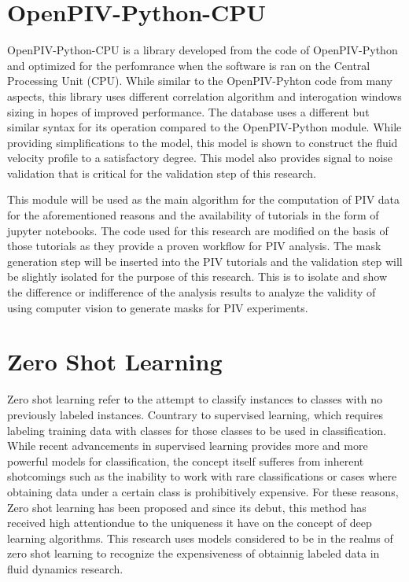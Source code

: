 \documentclass[12pt]{report}
\begin{document}
\section{OpenPIV-Python-CPU}
OpenPIV-Python-CPU is a library developed from the code of OpenPIV-Python and optimized for the perfomrance when the
software is ran on the Central Processing Unit (CPU). While similar to the OpenPIV-Pyhton code from many aspects, this
library uses different correlation algorithm and interogation windows sizing in hopes of improved performance. The database uses
a different but similar syntax for its operation compared to the OpenPIV-Python module. While providing simplifications to the model, this model
is shown to construct the fluid velocity profile to a satisfactory degree. This model also provides signal to noise validation that is critical for
the validation step of this research.

This module will be used as the main algorithm for the computation of PIV data for the aforementioned reasons and the availability of tutorials in the form
of jupyter notebooks. The code used for this research are modified on the basis of those tutorials as they provide a proven workflow for PIV analysis.
The mask generation step will be inserted into the PIV tutorials and the validation step will be slightly isolated for the 
purpose of this research. This is to isolate and show the difference or indifference of the analysis results to analyze the validity of using computer vision to generate
masks for PIV experiments.
\section{Zero Shot Learning}
Zero shot learning refer to the attempt to classify instances to classes with no previously labeled instances. Countrary
to supervised learning, which requires labeling training data with classes for those classes to be used in classification.
While recent advancements in supervised learning provides more and more powerful models for classification, the concept 
itself sufferes from inherent shotcomings such as the inability to work with rare classifications or cases where obtaining data 
under a certain class is prohibitively expensive. For these reasons, Zero shot learning has been proposed and since its debut, this method has
received high attentiondue to the uniqueness it have on the concept of deep learning algorithms. This research uses models considered to be in the realms
of zero shot learning to recognize the expensiveness of obtainnig labeled data in fluid dynamics research.
\end{document}

